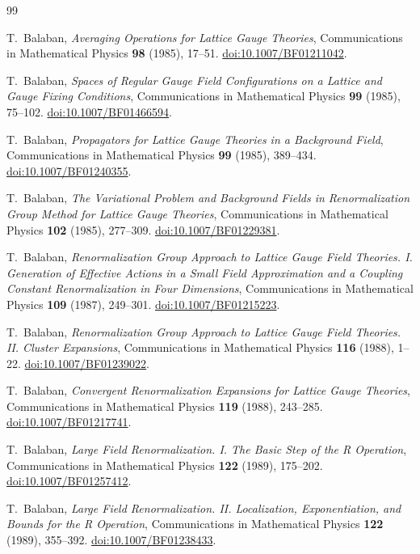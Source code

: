 \begin{thebibliography}{99}

T.~Balaban, \emph{Averaging Operations for Lattice Gauge Theories},
Communications in Mathematical Physics \textbf{98} (1985), 17--51.
\href{https://doi.org/10.1007/BF01211042}{doi:10.1007/BF01211042}.

T.~Balaban, \emph{Spaces of Regular Gauge Field Configurations on a Lattice and Gauge Fixing Conditions},
Communications in Mathematical Physics \textbf{99} (1985), 75--102.
\href{https://doi.org/10.1007/BF01466594}{doi:10.1007/BF01466594}.

T.~Balaban, \emph{Propagators for Lattice Gauge Theories in a Background Field},
Communications in Mathematical Physics \textbf{99} (1985), 389--434.
\href{https://doi.org/10.1007/BF01240355}{doi:10.1007/BF01240355}.

T.~Balaban, \emph{The Variational Problem and Background Fields in Renormalization Group Method for Lattice Gauge Theories},
Communications in Mathematical Physics \textbf{102} (1985), 277--309.
\href{https://doi.org/10.1007/BF01229381}{doi:10.1007/BF01229381}.

T.~Balaban, \emph{Renormalization Group Approach to Lattice Gauge Field Theories. I. Generation of Effective Actions in a Small Field Approximation and a Coupling Constant Renormalization in Four Dimensions},
Communications in Mathematical Physics \textbf{109} (1987), 249--301.
\href{https://doi.org/10.1007/BF01215223}{doi:10.1007/BF01215223}.

T.~Balaban, \emph{Renormalization Group Approach to Lattice Gauge Field Theories. II. Cluster Expansions},
Communications in Mathematical Physics \textbf{116} (1988), 1--22.
\href{https://doi.org/10.1007/BF01239022}{doi:10.1007/BF01239022}.

T.~Balaban, \emph{Convergent Renormalization Expansions for Lattice Gauge Theories},
Communications in Mathematical Physics \textbf{119} (1988), 243--285.
\href{https://doi.org/10.1007/BF01217741}{doi:10.1007/BF01217741}.

T.~Balaban, \emph{Large Field Renormalization. I. The Basic Step of the R Operation},
Communications in Mathematical Physics \textbf{122} (1989), 175--202.
\href{https://doi.org/10.1007/BF01257412}{doi:10.1007/BF01257412}.

T.~Balaban, \emph{Large Field Renormalization. II. Localization, Exponentiation, and Bounds for the R Operation},
Communications in Mathematical Physics \textbf{122} (1989), 355--392.
\href{https://doi.org/10.1007/BF01238433}{doi:10.1007/BF01238433}.


\end{thebibliography}
